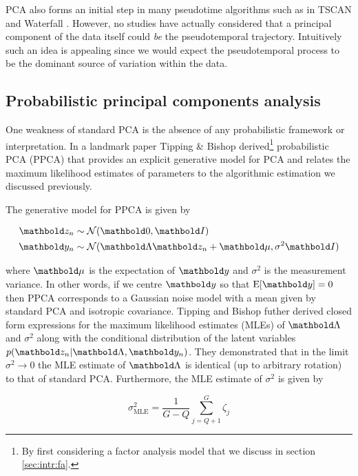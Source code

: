 PCA also forms an initial step in many pseudotime algorithms such as in TSCAN \cite{ji2016tscan} and Waterfall \cite{shin2015single}. However, no studies have actually considered that a principal component of the data itself could \emph{be} the pseudotemporal trajectory. Intuitively such an idea is appealing since we would expect the pseudotemporal process to be the dominant source of variation within the data.

\subsection{Probabilistic principal components analysis}

One weakness of standard PCA is the absence of any probabilistic framework or interpretation. In a landmark paper \cite{tipping1999probabilistic} Tipping \& Bishop derived\footnote{By first considering a factor analysis model that we discuss in section \ref{sec:intr:fa}.} probabilistic PCA (PPCA) that provides an explicit generative model for PCA and relates the maximum likelihood estimates of parameters to the algorithmic estimation we discussed previously.

The generative model for PPCA is given by

\begin{equation}
  \begin{aligned}
    \mbz_n & \sim \Norm(\mbzero, \mbI) \\
    \mby_n & \sim \Norm(\mbLambda \mbz_n + \mbmu, \sigma^2 \mbI)
  \end{aligned}
\end{equation}

where $\mbmu$ is the expectation of $\mby$ and $\sigma^2$ is the measurement variance. In other words, if we centre $\mby$ so that $\text{E}[\mby] = 0$ then PPCA corresponds to a Gaussian noise model with a mean given by standard PCA and isotropic covariance. Tipping and Bishop futher derived closed form expressions for the maximum likelihood estimates (MLEs) of $\mbLambda$ and $\sigma^2$ along with the conditional distribution of the latent variables $p(\mbz_n | \mbLambda, \mby_n)$. They demonstrated that in the limit $\sigma^2 \rightarrow 0$ the MLE estimate of $\mbLambda$ is identical (up to arbitrary rotation) to that of standard PCA. Furthermore, the MLE estimate of $\sigma^2$ is given by

\begin{equation}
  \sigma^2_{\text{MLE}} = \frac{1}{G-Q} \sum_{j = Q + 1}^G \zeta_j
\end{equation}

